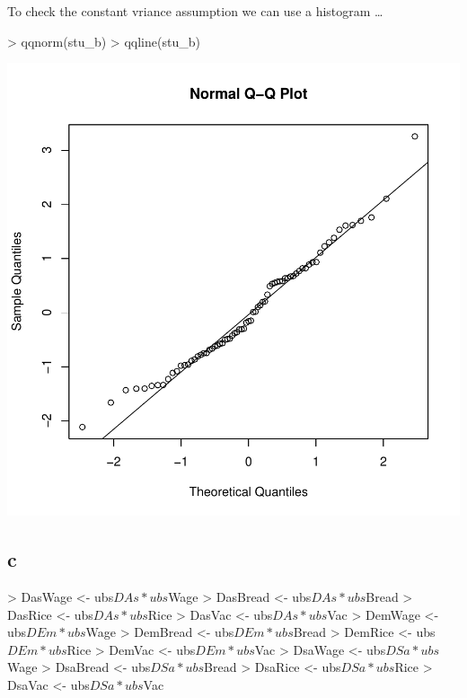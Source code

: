 \documentclass{article}
\begin{document}
To check the constant vriance assumption we can use a histogram \ldots
\begin{Schunk}
\begin{Sinput}
> qqnorm(stu_b)
> qqline(stu_b)
\end{Sinput}
\end{Schunk}
\includegraphics{RegressionFinal-006}

\subsection*{c}
\begin{Schunk}
\begin{Sinput}
> DasWage <- ubs$DAs*ubs$Wage
> DasBread <- ubs$DAs*ubs$Bread
> DasRice <- ubs$DAs*ubs$Rice
> DasVac <- ubs$DAs*ubs$Vac
> DemWage <- ubs$DEm*ubs$Wage
> DemBread <- ubs$DEm*ubs$Bread
> DemRice <- ubs$DEm*ubs$Rice
> DemVac <- ubs$DEm*ubs$Vac
> DsaWage <- ubs$DSa*ubs$Wage
> DsaBread <- ubs$DSa*ubs$Bread
> DsaRice <- ubs$DSa*ubs$Rice
> DsaVac <- ubs$DSa*ubs$Vac
\end{Sinput}
\end{Schunk}
\end{document}

